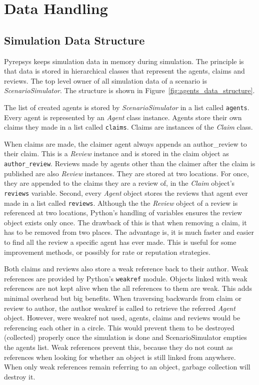 \documentclass[%
    ]{\PathToTumTemplate/thesis/tum_thesis}
\begin{document}
\section{Data Handling}\label{sec:impl_data}


\subsection{Simulation Data Structure}
Pyrepsys keeps simulation data in memory during simulation.
The principle is that data is stored in hierarchical classes that represent the agents, claims and reviews.
The top level owner of all simulation data of a scenario is \emph{ScenarioSimulator}.
The structure is shown in Figure~\ref{fig:agents_data_structure}.

The list of created agents is stored by \emph{ScenarioSimulator} in a list called \texttt{agents}.
Every agent is represented by an \emph{Agent} class instance.
Agents store their own claims they made in a list called \texttt{claims}.
Claims are instances of the \emph{Claim} class.

When claims are made, the claimer agent always appends an \gls{author_review} to their claim.
This is a \emph{Review} instance and is stored in the claim object as \texttt{author\_review}.
Reviews made by agents other than the claimer after the claim is published are also \emph{Review} instances.
They are stored at two locations.
For once, they are appended to the claims they are a review of, in the \emph{Claim} object's \texttt{reviews} variable.
Second, every \emph{Agent} object stores the reviews that agent ever made in a list called \texttt{reviews}.
Although the the \emph{Review} object of a review is referenced at two locations, Python's handling of variables ensures the review object exists only once.
The drawback of this is that when removing a claim, it has to be removed from two places.
The advantage is, it is much faster and easier to find all the review a specific agent has ever made.
This is useful for some improvement methods, or possibly for rate or reputation strategies.

Both claims and reviews also store a weak reference back to their author.
Weak references are provided by Python's \texttt{weakref} module.
Objects linked with weak references are not kept alive when the all references to them are weak.
This adds minimal overhead but big benefits.
When traversing backwards from claim or review to author, the author weakref is called to retrieve the referred \emph{Agent} object.
However, were weakref not used, agents, claims and reviews would be referencing each other in a circle.
This would prevent them to be destroyed (collected) properly once the simulation is done and ScenarioSimulator empties the agents list.
Weak references prevent this, because they do not count as references when looking for whether an object is still linked from anywhere.
When only weak references remain referring to an object, garbage collection will destroy it.
\end{document}
